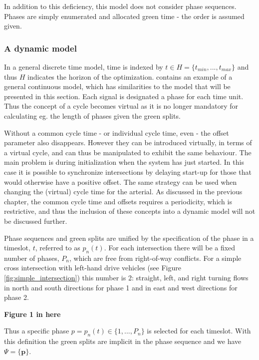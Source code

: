 In addition to this deficiency, this model does not consider phase
sequences. Phases are simply enumerated and allocated green time - the
order is assumed given.

\subsubsection*{A dynamic model}
\label{sec:dynamicmodel}

In a general discrete time model, time is indexed by $t \in H = \lbrace
t_{min},...,t_{max} \rbrace$ and thus $H$ indicates the horizon of the
optimization. \citet{36} contains an example of a general
continuous model, which has similarities to the  model that
will be presented in this section. Each signal is designated a phase
for each time unit. Thus the concept of a cycle becomes virtual as
it is no longer mandatory for calculating eg. the length of phases
given the green splits.

Without a common cycle time - or individual cycle time, even - the
offset parameter also disappears. However they can be introduced
virtually, in terms of a virtual cycle, and can thus be manipulated to
exhibit the same behaviour.  The main problem is during initialization
when the system has just started. In this case it is possible to
synchronize intersections by delaying start-up for those that would
otherwise have a positive offset. The same strategy can be used when
changing the (virtual) cycle time for the arterial. As discussed in
the previous chapter, the common cycle time and offsets requires a
periodicity, which is restrictive, and thus the inclusion of these
concepts into a dynamic model will not be discussed further.

Phase sequences and green splits are unified by the specification of
the phase in a timeslot, $t$, referred to as $p_n(t)$. For each
intersection there will be a fixed number of phases, $P_n$, which are
free from right-of-way conflicts. For a simple cross intersection with
left-hand drive vehicles (see Figure \ref{fig:simple_intersection})
this number is 2: straight, left, and right turning flows in north and
south directions for phase 1 and in east and west directions for phase
2.

\begin{center}
{\bf Figure 1 in here}
\end{center}

Thus a specific phase $p = p_n(t) \in \lbrace 1,...,P_n \rbrace$ is
selected for each timeslot. With this definition the green splits are
implicit in the phase sequence and we have $\Psi = \lbrace \textbf{p}
\rbrace $.


